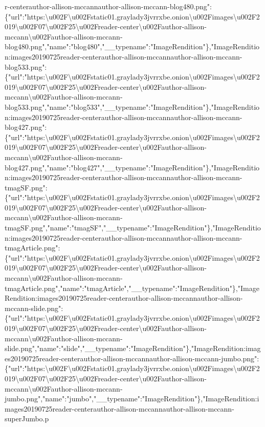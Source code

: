 r-centerauthor-allison-mccannauthor-allison-mccann-blog480.png":\{"url":"https:\textbackslash{}u002F\textbackslash{}u002Fstatic01.graylady3jvrrxbe.onion\textbackslash{}u002Fimages\textbackslash{}u002F2019\textbackslash{}u002F07\textbackslash{}u002F25\textbackslash{}u002Freader-center\textbackslash{}u002Fauthor-allison-mccann\textbackslash{}u002Fauthor-allison-mccann-blog480.png","name":"blog480","\_\_typename":"ImageRendition"\},"ImageRendition:images20190725reader-centerauthor-allison-mccannauthor-allison-mccann-blog533.png":\{"url":"https:\textbackslash{}u002F\textbackslash{}u002Fstatic01.graylady3jvrrxbe.onion\textbackslash{}u002Fimages\textbackslash{}u002F2019\textbackslash{}u002F07\textbackslash{}u002F25\textbackslash{}u002Freader-center\textbackslash{}u002Fauthor-allison-mccann\textbackslash{}u002Fauthor-allison-mccann-blog533.png","name":"blog533","\_\_typename":"ImageRendition"\},"ImageRendition:images20190725reader-centerauthor-allison-mccannauthor-allison-mccann-blog427.png":\{"url":"https:\textbackslash{}u002F\textbackslash{}u002Fstatic01.graylady3jvrrxbe.onion\textbackslash{}u002Fimages\textbackslash{}u002F2019\textbackslash{}u002F07\textbackslash{}u002F25\textbackslash{}u002Freader-center\textbackslash{}u002Fauthor-allison-mccann\textbackslash{}u002Fauthor-allison-mccann-blog427.png","name":"blog427","\_\_typename":"ImageRendition"\},"ImageRendition:images20190725reader-centerauthor-allison-mccannauthor-allison-mccann-tmagSF.png":\{"url":"https:\textbackslash{}u002F\textbackslash{}u002Fstatic01.graylady3jvrrxbe.onion\textbackslash{}u002Fimages\textbackslash{}u002F2019\textbackslash{}u002F07\textbackslash{}u002F25\textbackslash{}u002Freader-center\textbackslash{}u002Fauthor-allison-mccann\textbackslash{}u002Fauthor-allison-mccann-tmagSF.png","name":"tmagSF","\_\_typename":"ImageRendition"\},"ImageRendition:images20190725reader-centerauthor-allison-mccannauthor-allison-mccann-tmagArticle.png":\{"url":"https:\textbackslash{}u002F\textbackslash{}u002Fstatic01.graylady3jvrrxbe.onion\textbackslash{}u002Fimages\textbackslash{}u002F2019\textbackslash{}u002F07\textbackslash{}u002F25\textbackslash{}u002Freader-center\textbackslash{}u002Fauthor-allison-mccann\textbackslash{}u002Fauthor-allison-mccann-tmagArticle.png","name":"tmagArticle","\_\_typename":"ImageRendition"\},"ImageRendition:images20190725reader-centerauthor-allison-mccannauthor-allison-mccann-slide.png":\{"url":"https:\textbackslash{}u002F\textbackslash{}u002Fstatic01.graylady3jvrrxbe.onion\textbackslash{}u002Fimages\textbackslash{}u002F2019\textbackslash{}u002F07\textbackslash{}u002F25\textbackslash{}u002Freader-center\textbackslash{}u002Fauthor-allison-mccann\textbackslash{}u002Fauthor-allison-mccann-slide.png","name":"slide","\_\_typename":"ImageRendition"\},"ImageRendition:images20190725reader-centerauthor-allison-mccannauthor-allison-mccann-jumbo.png":\{"url":"https:\textbackslash{}u002F\textbackslash{}u002Fstatic01.graylady3jvrrxbe.onion\textbackslash{}u002Fimages\textbackslash{}u002F2019\textbackslash{}u002F07\textbackslash{}u002F25\textbackslash{}u002Freader-center\textbackslash{}u002Fauthor-allison-mccann\textbackslash{}u002Fauthor-allison-mccann-jumbo.png","name":"jumbo","\_\_typename":"ImageRendition"\},"ImageRendition:images20190725reader-centerauthor-allison-mccannauthor-allison-mccann-superJumbo.p
